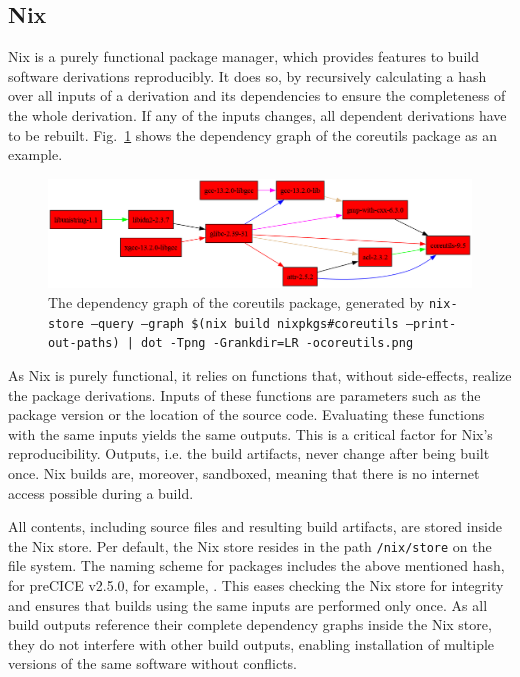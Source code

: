 \documentclass{eceasst}
\begin{document}
\subsection{Nix}\label{sec:nix}

Nix is a purely functional package manager, which provides features to build software derivations reproducibly.
It does so, by recursively calculating a hash over all inputs of a derivation and its dependencies to ensure the completeness of the whole derivation.
If any of the inputs changes, all dependent derivations have to be rebuilt.
Fig.~\ref{fig:nix-graph} shows the dependency graph of the coreutils package as an example.

\begin{figure}
    \centering
    \includegraphics[width=1\textwidth]{figures/coreutils.png}
    \caption{The dependency graph of the coreutils package, generated by \texttt{nix-store --query --graph \$(nix build nixpkgs\#coreutils --print-out-paths) | dot -Tpng -Grankdir=LR -ocoreutils.png}}
    \label{fig:nix-graph}
\end{figure}

As Nix is purely functional, it relies on functions that, without side-effects, realize the package derivations.
Inputs of these functions are parameters such as the package version or the location of the source code.
Evaluating these functions with the same inputs yields the same outputs.
This is a critical factor for Nix's reproducibility.
Outputs, i.e. the build artifacts, never change after being built once.
Nix builds are, moreover, sandboxed, meaning that there is no internet access possible during a build.

All contents, including source files and resulting build artifacts, are stored inside the Nix store.
Per default, the Nix store resides in the path \texttt{/nix/store} on the file system.
The naming scheme for packages includes the above mentioned hash, for preCICE v2.5.0, for example,
.
This eases checking the Nix store for integrity and ensures that builds using the same inputs are performed only once.
As all build outputs reference their complete dependency graphs inside the Nix store, they do not interfere with other build outputs, enabling installation of multiple versions of the same software without conflicts.
\end{document}
